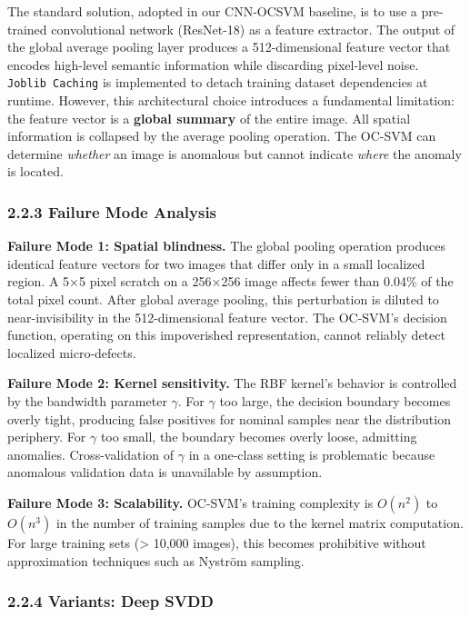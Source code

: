 The standard solution, adopted in our CNN-OCSVM baseline, is to use a pre-trained convolutional network (ResNet-18) as a feature extractor. The output of the global average pooling layer produces a 512-dimensional feature vector that encodes high-level semantic information while discarding pixel-level noise. \texttt{Joblib\ Caching} is implemented to detach training dataset dependencies at runtime. However, this architectural choice introduces a fundamental limitation: the feature vector is a \textbf{global summary} of the entire image. All spatial information is collapsed by the average pooling operation. The OC-SVM can determine \emph{whether} an image is anomalous but cannot indicate \emph{where} the anomaly is located.

\subsubsection{2.2.3 Failure Mode Analysis}\label{failure-mode-analysis-1}

\textbf{Failure Mode 1: Spatial blindness.} The global pooling operation produces identical feature vectors for two images that differ only in a small localized region. A 5×5 pixel scratch on a 256×256 image affects fewer than 0.04\% of the total pixel count. After global average pooling, this perturbation is diluted to near-invisibility in the 512-dimensional feature vector. The OC-SVM's decision function, operating on this impoverished representation, cannot reliably detect localized micro-defects.

\textbf{Failure Mode 2: Kernel sensitivity.} The RBF kernel's behavior is controlled by the bandwidth parameter \(\gamma\). For \(\gamma\) too large, the decision boundary becomes overly tight, producing false positives for nominal samples near the distribution periphery. For \(\gamma\) too small, the boundary becomes overly loose, admitting anomalies. Cross-validation of \(\gamma\) in a one-class setting is problematic because anomalous validation data is unavailable by assumption.

\textbf{Failure Mode 3: Scalability.} OC-SVM's training complexity is \(O(n^2)\) to \(O(n^3)\) in the number of training samples due to the kernel matrix computation. For large training sets (\textgreater{} 10,000 images), this becomes prohibitive without approximation techniques such as Nyström sampling.

\subsubsection{2.2.4 Variants: Deep SVDD}\label{variants-deep-svdd}

